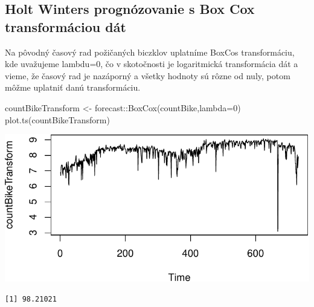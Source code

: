 \documentclass[
  letterpaper,
  DIV=11,
  numbers=noendperiod]{scrreprt}
\newenvironment{Shaded}{\begin{snugshade}}{\end{snugshade}}
\newcommand{\AttributeTok}[1]{\textcolor[rgb]{0.40,0.45,0.13}{#1}}
\newcommand{\ConstantTok}[1]{\textcolor[rgb]{0.56,0.35,0.01}{#1}}
\newcommand{\DecValTok}[1]{\textcolor[rgb]{0.68,0.00,0.00}{#1}}
\newcommand{\FunctionTok}[1]{\textcolor[rgb]{0.28,0.35,0.67}{#1}}
\newcommand{\NormalTok}[1]{\textcolor[rgb]{0.00,0.23,0.31}{#1}}
\newcommand{\OtherTok}[1]{\textcolor[rgb]{0.00,0.23,0.31}{#1}}
\newcommand{\SpecialCharTok}[1]{\textcolor[rgb]{0.37,0.37,0.37}{#1}}
\begin{document}
\subsection{Holt Winters prognózovanie s Box Cox transformáciou
dát}\label{holt-winters-prognuxf3zovanie-s-box-cox-transformuxe1ciou-duxe1t}

Na pôvodný časový rad požičaných biczklov uplatníme BoxCos
transformáciu, kde uvažujeme lambdu=0, čo v skotočnosti je logaritmická
transformácia dát a vieme, že časový rad je nazáporný a všetky hodnoty
sú rôzne od nuly, potom môžme uplatniť danú transformáciu.

\begin{Shaded}
\begin{Highlighting}[]
\NormalTok{countBikeTransform }\OtherTok{\textless{}{-}}\NormalTok{ forecast}\SpecialCharTok{::}\FunctionTok{BoxCox}\NormalTok{(countBike,}\AttributeTok{lambda=}\DecValTok{0}\NormalTok{)}
\FunctionTok{plot.ts}\NormalTok{(countBikeTransform)}
\end{Highlighting}
\end{Shaded}

\includegraphics{prednaska2_HoltWinters_files/figure-pdf/unnamed-chunk-11-1.pdf}

\begin{Shaded}
\end{Shaded}

\begin{verbatim}
[1] 98.21021
\end{verbatim}
\end{document}
